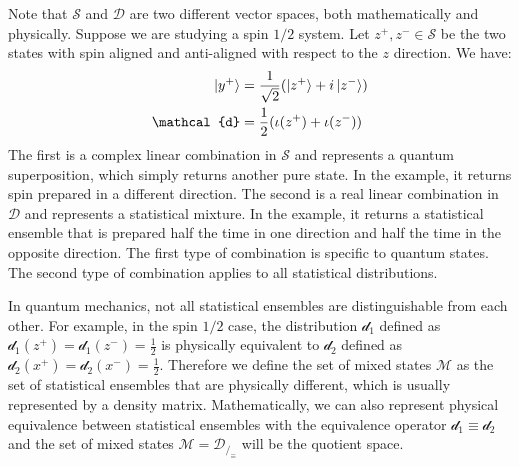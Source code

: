 \documentclass[11pt]{article}
\begin{document}
Note that $\mathcal{S}$ and $\mathcal{D}$ are two different vector spaces, both mathematically and physically. Suppose we are studying a spin $1/2$ system. Let $z^+, z^- \in \mathcal{S}$ be the two states with spin aligned and anti-aligned with respect to the $z$ direction. We have:
\begin{equation}
\begin{aligned}
\ket{y^+} &= \frac{1}{\sqrt{2}} (\ket{z^+} + i \ket{z^-}) \\
\mathcal{d}&= \frac{1}{2} (\iota(z^+) + \iota(z^-))
\end{aligned}
\end{equation}
The first is a complex linear combination in $\mathcal{S}$ and represents a quantum superposition, which simply returns another pure state. In the example, it returns spin prepared in a different direction. The second is a real linear combination in $\mathcal{D}$ and represents a statistical mixture. In the example, it returns a statistical ensemble that is prepared half the time in one direction and half the time in the opposite direction. The first type of combination is specific to quantum states. The second type of combination applies to all statistical distributions.

In quantum mechanics, not all statistical ensembles are distinguishable from each other. For example, in the spin $1/2$ case, the distribution $\mathcal{d}_1$ defined as $\mathcal{d}_1(z^+)=\mathcal{d}_1(z^-)=\frac{1}{2}$ is physically equivalent to $\mathcal{d}_2$ defined as $\mathcal{d}_2(x^+)=\mathcal{d}_2(x^-)=\frac{1}{2}$. Therefore we define the set of mixed states $\mathcal{M}$ as the set of statistical ensembles that are physically different, which is usually represented by a density matrix. Mathematically, we can also represent physical equivalence between statistical ensembles with the equivalence operator $\mathcal{d}_1 \equiv \mathcal{d}_2$ and the set of mixed states $\mathcal{M} = \mathcal{D}_{/_\equiv}$ will be the quotient space.
\end{document}
